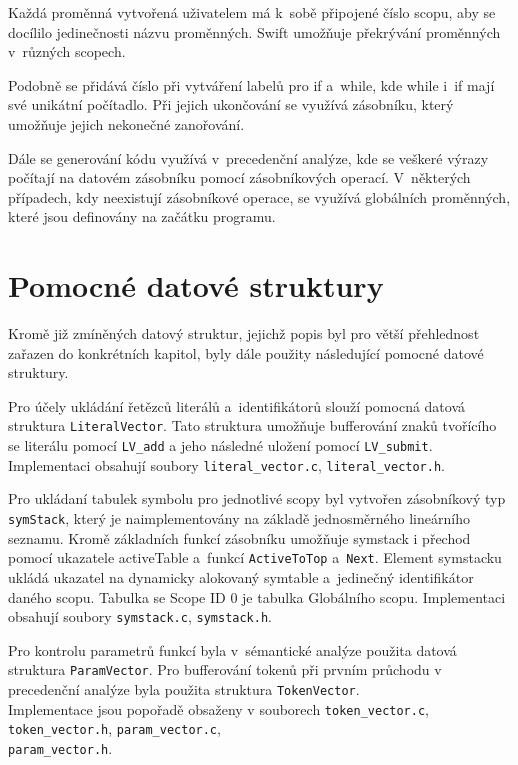 \documentclass[11pt]{article}
\begin{document}
Každá proměnná vytvořená uživatelem má k~sobě připojené číslo scopu, aby se docílilo jedinečnosti názvu proměnných.
Swift umožňuje překrývání proměnných v~různých scopech.

Podobně se přidává číslo při vytváření labelů pro if a~while, kde while i~if mají své unikátní počítadlo.
Při jejich ukončování se využívá zásobníku, který umožňuje jejich nekonečné zanořování.


Dále se generování kódu využívá v~precedenční analýze, kde se veškeré výrazy počítají na datovém zásobníku pomocí zásobníkových operací.
V~některých případech, kdy neexistují zásobníkové operace, se využívá globálních proměnných, které jsou definovány na začátku programu.


\section{Pomocné datové struktury}

Kromě již zmíněných datový struktur, jejichž popis byl pro větší přehlednost zařazen do
konkrétních kapitol, byly dále použity následující pomocné datové struktury.

Pro účely ukládání řetězců literálů a~identifikátorů slouží pomocná datová struktura \texttt{LiteralVector}.
Tato struktura umožňuje bufferování znaků tvořícího se literálu pomocí
\texttt{LV\_add} a jeho následné uložení pomocí \texttt{LV\_submit}.
Implementaci obsahují soubory \texttt{literal\_vector.c}, \texttt{literal\_vector.h}.

Pro ukládaní tabulek symbolu pro jednotlivé scopy byl vytvořen zásobníkový typ \texttt{symStack},
který je naimplementovány na základě jednosměrného lineárního seznamu. Kromě základních funkcí
zásobníku umožňuje symstack i přechod pomocí ukazatele activeTable a~funkcí \texttt{ActiveToTop} a~\texttt{Next}.
Element symstacku ukládá ukazatel na dynamicky alokovaný symtable a~jedinečný identifikátor daného scopu.
Tabulka se Scope ID 0 je tabulka Globálního scopu.
Implementaci obsahují soubory \texttt{symstack.c}, \texttt{symstack.h}.

Pro kontrolu parametrů funkcí byla v~sémantické analýze použita datová struktura \texttt{ParamVector}.
Pro bufferování tokenů při prvním průchodu v precedenční analýze byla použita struktura \texttt{TokenVector}.\\
Implementace jsou popořadě obsaženy v souborech
\texttt{token\_vector.c}, \texttt{token\_vector.h}, \texttt{param\_vector.c}, \\ \texttt{param\_vector.h}.
\end{document}
